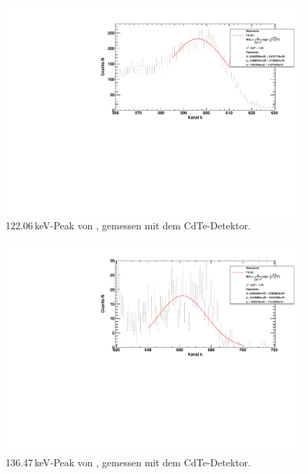 \begin{figure}[H]
\begin{center}
  \includegraphics[width=\textwidth]{../img/part3/Co-CdTe_00.pdf}
  \caption{122.06\,keV-Peak von \co, gemessen mit dem CdTe-Detektor.}
  \label{img:co:cdte:peak0}
\end{center}
\end{figure}

\begin{figure}[H]
\begin{center}
  \includegraphics[width=\textwidth]{../img/part3/Co-CdTe_01.pdf}
  \caption{136.47\,keV-Peak von \co, gemessen mit dem CdTe-Detektor.}
  \label{img:co:cdte:peak1}
\end{center}
\end{figure}

